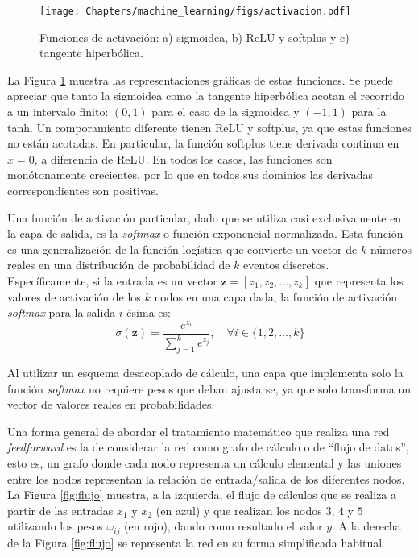 \begin{figure}[t]
    \begin{center}
    \texttt{[image: Chapters/machine\_learning/figs/activacion.pdf]}
\end{center}
\caption{Funciones de activación: a) sigmoidea, b) ReLU y softplus y c) tangente hiperbólica.}
\label{fig:factivacion}
\end{figure}

La Figura \ref{fig:factivacion} muestra las representaciones gráficas de estas funciones. Se puede apreciar que tanto la sigmoidea como la tangente hiperbólica acotan el recorrido a un intervalo finito: $(0, 1)$ para el caso de la sigmoidea y $(-1, 1)$ para la tanh. Un comporamiento diferente tienen ReLU y softplus, ya que estas funciones no están acotadas. En particular, la función softplus tiene derivada continua en $x = 0$, a diferencia de ReLU. En todos los casos, las funciones son monótonamente crecientes, por lo que en todos sus dominios las derivadas correspondientes son positivas.

Una función de activación particular, dado que se utiliza casi exclusivamente en la capa de salida, es la \textit{softmax} o función exponencial normalizada. Esta función es una generalización de la función logística que convierte un vector de $k$ números reales en una distribución de probabilidad de $k$ eventos discretos. Específicamente, si la entrada es un vector $\bm{z} = [z_1, z_2, \ldots, z_k]$ que representa los valores de activación de los $k$ nodos en una capa dada, la función de activación \textit{softmax} para la salida $i$-ésima es:
\[ \sigma(\bm{z}) = \frac{e^{z_i}}{\sum_{j=1}^k e^{z_j}}, \quad \forall i \in \{1, 2, \ldots, k\} \]

Al utilizar un esquema desacoplado de cálculo, una capa que implementa solo la función \textit{softmax} no requiere pesos que deban ajustarse, ya que solo transforma un vector de valores reales en probabilidades.

Una forma general de abordar el tratamiento matemático que realiza una red \textit{feedforward} es la de considerar la red como grafo de cálculo o de ``flujo de datos'', esto es, un grafo donde cada nodo representa un cálculo elemental y las uniones entre los nodos representan la relación de entrada/salida de los diferentes nodos. La Figura \ref{fig:flujo} muestra, a la izquierda, el flujo de cálculos que se realiza a partir de las entradas $x_1$ y $x_2$ (en azul) y que realizan los nodos $3$, $4$ y $5$ utilizando los pesos $\omega_{ij}$ (en rojo), dando como resultado el valor $y$. A la derecha de la Figura \ref{fig:flujo} se representa la red en su forma simplificada habitual.


